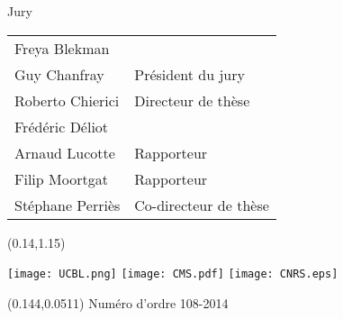 \begin{titlepage}
\begin{center} \small
Jury \\
\begin{tabular}{L{5cm}l}
Freya Blekman & \\
Guy Chanfray & Président du jury \\
Roberto Chierici & Directeur de thèse \\
Frédéric Déliot & \\
Arnaud Lucotte & Rapporteur \\
Filip Moortgat & Rapporteur \\
Stéphane Perriès & Co-directeur de thèse
\end{tabular}

\end{center}

\vfill

\begin{textblock}{1}(0.14,1.15)
\begin{center}
\texttt{[image: UCBL.png]} \hspace{1cm}  \hspace{1cm} \texttt{[image: CMS.pdf]} \hspace{1cm} \texttt{[image: CNRS.eps]}
\end{center}
\end{textblock}

\begin{textblock}{1}(0.144,0.0511)
Numéro d'ordre 108-2014
\end{textblock}

\end{titlepage}